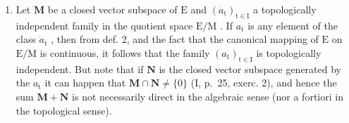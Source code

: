 \begin{enumerate}
\def\labelenumi{\arabic{enumi})}
\setcounter{enumi}{1}
\tightlist
\item
  Let \(\mathbf{M}\) be a closed vector subspace of \(\mathrm{E}\) and \((\dot{a}_{\mathrm{t}})_{\mathrm{t}\in \mathrm{I}}\) a topologically independent family in the quotient space \(\mathrm{E / M}\) . If \(a_{\mathrm{t}}\) is any element of the class \(\dot{a}_{\mathrm{t}}\) , then from def. 2, and the fact that the canonical mapping of \(\mathrm{E}\) on \(\mathrm{E / M}\) is continuous, it follows that the family \((a_{\mathrm{t}})_{\mathrm{t}\in \mathrm{I}}\) is topologically independent. But note that if \(\mathbf{N}\) is the closed vector subspace generated by the \(a_{\mathrm{t}}\) it can happen that \(\mathbf{M} \cap \mathbf{N} \neq \{0\}\) (I, p.~25, exerc. 2), and hence the sum \(\mathbf{M} + \mathbf{N}\) is not necessarily direct in the algebraic sense (nor a fortiori in the topological sense).
\end{enumerate}

